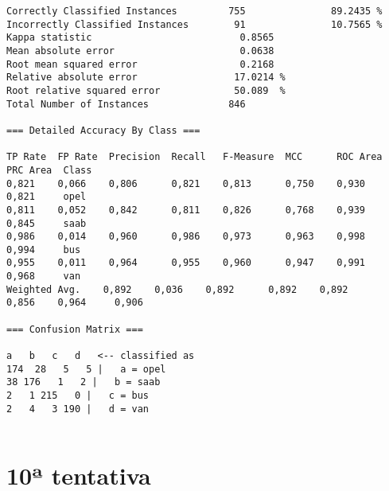 \documentclass[
	article,			%
	11pt,				%
	oneside,			%
	a4paper,			%
	english,			%
	brazil,				%
	sumario=tradicional
	]{abntex2}
\begin{document}
\begin{lstlisting}
Correctly Classified Instances         755               89.2435 %
Incorrectly Classified Instances        91               10.7565 %
Kappa statistic                          0.8565
Mean absolute error                      0.0638
Root mean squared error                  0.2168
Relative absolute error                 17.0214 %
Root relative squared error             50.089  %
Total Number of Instances              846     

=== Detailed Accuracy By Class ===

TP Rate  FP Rate  Precision  Recall   F-Measure  MCC      ROC Area  PRC Area  Class
0,821    0,066    0,806      0,821    0,813      0,750    0,930     0,821     opel
0,811    0,052    0,842      0,811    0,826      0,768    0,939     0,845     saab
0,986    0,014    0,960      0,986    0,973      0,963    0,998     0,994     bus
0,955    0,011    0,964      0,955    0,960      0,947    0,991     0,968     van
Weighted Avg.    0,892    0,036    0,892      0,892    0,892      0,856    0,964     0,906     

=== Confusion Matrix ===

a   b   c   d   <-- classified as
174  28   5   5 |   a = opel
38 176   1   2 |   b = saab
2   1 215   0 |   c = bus
2   4   3 190 |   d = van


\end{lstlisting}

\section{10ª tentativa}
\end{document}
